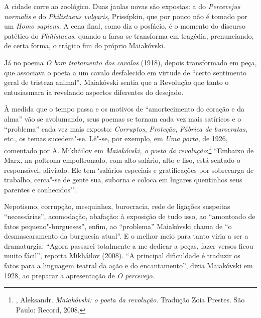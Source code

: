 A cidade corre ao zoológico. Duas jaulas novas são expostas: a do
\emph{Percevejus normalis} e do \emph{Philistaeus vulgaris},
Prissípkin, que por pouco não é tomado por um \emph{Homo sapiens}. A
cena final, como diz o posfácio, é o momento do discurso patético do
\emph{Philistaeus}, quando a farsa se transforma em tragédia,
prenunciando, de certa forma, o trágico fim do próprio Maiakóvski.

Já no poema \emph{O bom tratamento dos cavalos} (1918), depois
transformado em peça, que associava o poeta a um cavalo desfalecido em
virtude de ``certo sentimento geral de tristeza animal'', Maiakóvski
sentia que a Revolução que tanto o entusiasmara ia revelando aspectos
diferentes do desejado.

À medida que o tempo passa e os motivos de ``amortecimento do coração e
da alma'' vão se avolumando, seus poemas se tornam cada vez mais
satíricos e o ``problema'' cada vez mais exposto: \emph{Corruptos},
\emph{Proteção}, \emph{Fábrica de burocratas}, etc., os temas
sucedem"-se. Lê"-se, por exemplo, em \emph{Uma porta}, de 1926, comentado
por A. Mikháilov em \emph{Maiakóvski, o poeta da revolução}:\footnote{,
  Aleksandr. \emph{Maiakóvski: o poeta da revolução}. Tradução Zoia
  Prestes. São Paulo: Record, 2008.} ``Embaixo de Marx, na poltrona
empoltronado, com alto salário, alto e liso, está sentado o responsável,
aliviado. Ele tem `salários especiais e gratificações por sobrecarga de
trabalho, cerca"-se de gente sua, suborna e coloca em lugares quentinhos
seus parentes e conhecidos'".

Nepotismo, corrupção, mesquinhez, burocracia, rede de ligações suspeitas
``necessárias'', acomodação, abafação: à exposição de tudo isso, ao
``amontoado de fatos pequeno"-burgueses'', enfim, ao ``problema'' Maiakóvski
chama de ``o desmascaramento da burguesia atual''. E o melhor meio para
tanto viria a ser a dramaturgia: ``Agora passarei totalmente a me dedicar
a peças, fazer versos ficou muito fácil'', reporta Mikháilov (2008). ``A
principal dificuldade é traduzir os fatos para a linguagem teatral da
ação e do encantamento'', dizia Maiakóvski em 1928, ao preparar a
apresentação de \emph{O percevejo}.

